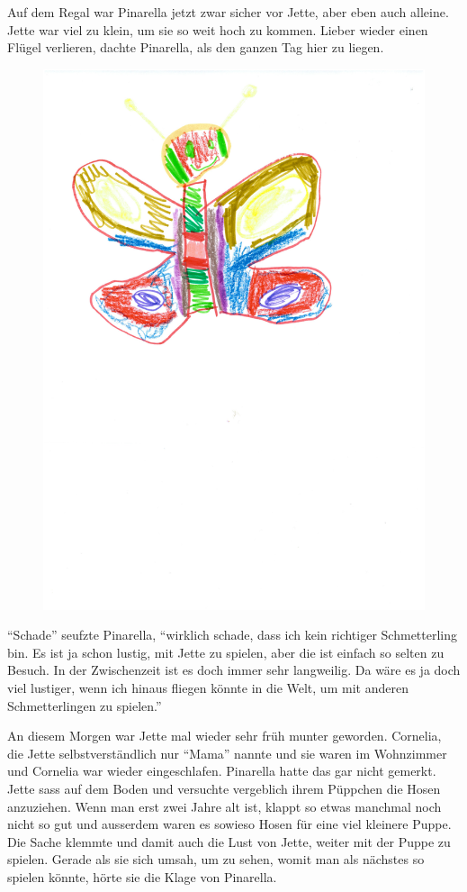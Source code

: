 Auf dem Regal war Pinarella jetzt zwar sicher vor Jette, aber eben auch alleine. Jette war viel zu klein, um sie so weit hoch zu kommen. Lieber wieder einen Flügel verlieren, dachte Pinarella, als den ganzen Tag hier zu liegen. 

\begin{figure}[ht]
\centering
\includegraphics[width=.8\textwidth]{bilder/pinarella.pdf}
\end{figure}

\enquote{Schade} seufzte Pinarella, \enquote{wirklich schade, dass ich kein richtiger Schmetterling bin. Es ist ja schon lustig, mit Jette zu spielen, aber die ist einfach so selten zu Besuch. In der Zwischenzeit ist es doch immer sehr langweilig. Da wäre es ja doch viel lustiger, wenn ich hinaus fliegen könnte in die Welt, um mit anderen Schmetterlingen zu spielen.} 

An diesem Morgen war Jette mal wieder sehr früh munter geworden. Cornelia, die Jette selbstverständlich nur \enquote{Mama}  nannte und sie waren im Wohnzimmer und Cornelia war wieder eingeschlafen. Pinarella hatte das gar nicht gemerkt. Jette sass auf dem Boden und versuchte vergeblich ihrem Püppchen die Hosen anzuziehen. Wenn man erst zwei Jahre alt ist, klappt so etwas manchmal noch nicht so gut und ausserdem waren es sowieso Hosen für eine viel kleinere Puppe. Die Sache klemmte und damit auch die Lust von Jette, weiter mit der Puppe zu spielen. Gerade als sie sich umsah, um zu sehen, womit man als nächstes so spielen könnte, hörte sie die Klage von Pinarella. 

